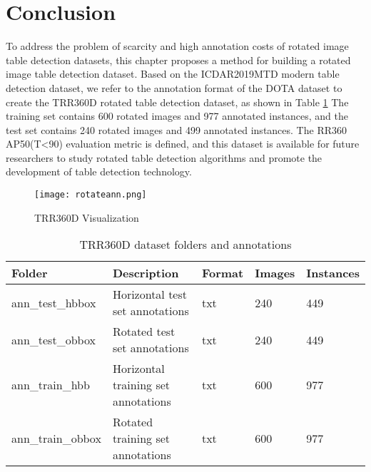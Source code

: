 \documentclass{article}
\begin{document}
\section{Conclusion}

To address the problem of scarcity and high annotation costs of rotated image table detection datasets, this chapter proposes a method for building a rotated image table detection dataset. Based on the ICDAR2019MTD modern table detection dataset, we refer to the annotation format of the DOTA dataset to create the TRR360D rotated table detection dataset, as shown in Table \ref{tab:ann} The training set contains 600 rotated images and 977 annotated instances, and the test set contains 240 rotated images and 499 annotated instances. The RR360 AP50(T<90) evaluation metric is defined, and this dataset is available for future researchers to study rotated table detection algorithms and promote the development of table detection technology.


\begin{figure}[ht]
    \centering
    \texttt{[image: rotateann.png]}
    \caption{TRR360D Visualization}
    \label{fig:Rotate1}
\end{figure}

\begin{table}
	\caption{TRR360D dataset folders and annotations}
	\centering
	\begin{tabular}{lllll}
\cmidrule(r){1-5}
		Folder     & Description     & Format & Images & Instances\\
		\midrule
ann\_test\_hbbox & Horizontal test set annotations & txt & 240 & 449 \\
        ann\_test\_obbox & Rotated test set annotations & txt & 240 & 449 \\
        ann\_train\_hbb & Horizontal training set annotations & txt & 600 & 977 \\
        ann\_train\_obbox & Rotated training set annotations & txt & 600 & 977 \\
		\bottomrule
	\end{tabular}
	\label{tab:ann}
\end{table}




  
  
\end{document}

